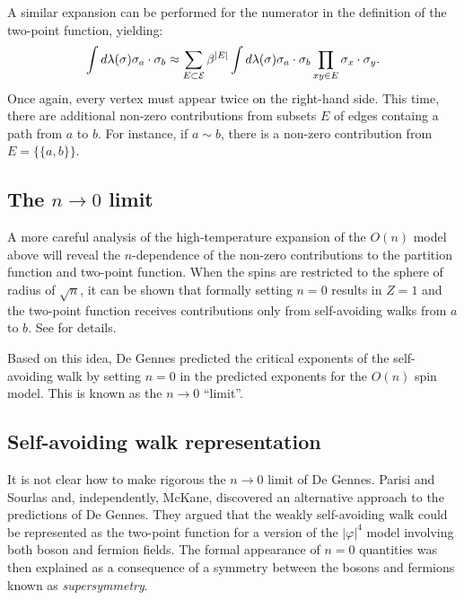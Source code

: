 A similar expansion can be performed for the numerator in the definition of the
two-point function, yielding:
\begin{equation}
\int d\lambda(\sigma) \sigma_a \cdot \sigma_b
	\approx
\sum_{E\subset\mathcal{E}} \beta^{|E|}
\int d\lambda(\sigma) \sigma_a \cdot \sigma_b
\prod_{xy\in E} \sigma_x \cdot \sigma_y.
\end{equation}
Once again, every vertex must appear twice on the right-hand side. This time,
there are additional non-zero contributions from subsets $E$ of edges containg
a path from $a$ to $b$. For instance, if $a \sim b$, there is a non-zero
contribution from $E = \{ \{ a, b \} \}$.


\subsection{The \texorpdfstring{$n\to0$}{n approaches 0} limit}


A more careful analysis of the high-temperature expansion of the $O(n)$ model
above will reveal the $n$-dependence of the non-zero contributions to the
partition function and two-point function. When the spins are restricted to
the sphere of radius of $\sqrt n$, it can be shown that formally setting $n = 0$
results in $Z = 1$ and the two-point function receives contributions only from
self-avoiding walks from $a$ to $b$. See \cite[Section 2.3]{MS93} for details.

Based on this idea, De Gennes predicted the critical exponents of the self-avoiding
walk by setting $n = 0$ in the predicted exponents for the $O(n)$ spin model.
This is known as the $n \to 0$ ``limit''.


\subsection{Self-avoiding walk representation}
\label{sec:intrep}


It is not clear how to make rigorous the $n\to0$ limit of De Gennes. Parisi and
Sourlas and, independently, McKane, discovered an alternative approach to the
predictions of De Gennes. They argued that the weakly
self-avoiding walk  could be represented as the two-point
function for a version of the $|\varphi|^4$ model involving both boson and fermion
fields. The formal appearance of $n = 0$ quantities was then explained as a
consequence of a symmetry between the bosons and fermions known as \emph{supersymmetry}.


